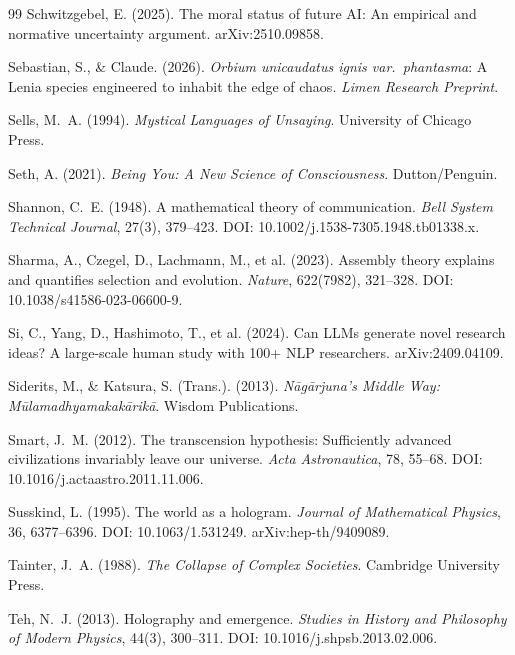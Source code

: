 \documentclass[12pt, a4paper]{article}
\begin{document}
\begin{thebibliography}{99}
Schwitzgebel, E. (2025). The moral status of future AI: An empirical and normative
uncertainty argument. arXiv:2510.09858.

Sebastian, S., \& Claude. (2026). \textit{Orbium unicaudatus ignis var.\ phantasma}: A
Lenia species engineered to inhabit the edge of chaos. \textit{Limen Research Preprint}.

Sells, M.~A. (1994). \textit{Mystical Languages of Unsaying}. University of Chicago Press.

Seth, A. (2021). \textit{Being You: A New Science of Consciousness}. Dutton/Penguin.

Shannon, C.~E. (1948). A mathematical theory of communication. \textit{Bell System
Technical Journal}, 27(3), 379--423. DOI: 10.1002/j.1538-7305.1948.tb01338.x.

Sharma, A., Czegel, D., Lachmann, M., et al. (2023). Assembly theory explains and quantifies
selection and evolution. \textit{Nature}, 622(7982), 321--328.
DOI: 10.1038/s41586-023-06600-9.

Si, C., Yang, D., Hashimoto, T., et al. (2024). Can LLMs generate novel research ideas?
A large-scale human study with 100+ NLP researchers. arXiv:2409.04109.

Siderits, M., \& Katsura, S. (Trans.). (2013). \textit{N\={a}g\={a}rjuna's Middle Way:
M\={u}lamadhyamakak\={a}rik\={a}}. Wisdom Publications.

Smart, J.~M. (2012). The transcension hypothesis: Sufficiently advanced civilizations
invariably leave our universe. \textit{Acta Astronautica}, 78, 55--68.
DOI: 10.1016/j.actaastro.2011.11.006.

Susskind, L. (1995). The world as a hologram. \textit{Journal of Mathematical Physics},
36, 6377--6396. DOI: 10.1063/1.531249. arXiv:hep-th/9409089.

Tainter, J.~A. (1988). \textit{The Collapse of Complex Societies}. Cambridge University Press.

Teh, N.~J. (2013). Holography and emergence. \textit{Studies in History and Philosophy of
Modern Physics}, 44(3), 300--311. DOI: 10.1016/j.shpsb.2013.02.006.


\end{thebibliography}
\end{document}
